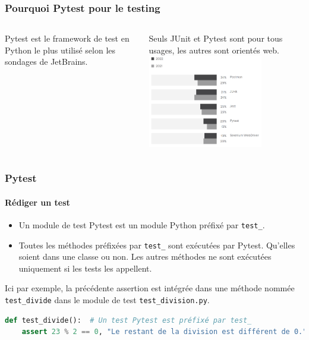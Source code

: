 \documentclass{beamer}
\begin{document}
    \begin{frame}
        \frametitle{Pourquoi Pytest pour le testing}
        \transdissolve
        \begin{columns}
            Pytest est le framework de test en Python le plus utilisé selon les sondages de JetBrains\footnotemark.

            Seuls JUnit et Pytest sont pour tous usages, les autres sont orientés web.
            \centering
            \includegraphics[width=5cm]{image/jetbrains-survey-testing-framework}
        \end{columns}

    \end{frame}

    \begin{frame}[fragile]
        \frametitle{Pytest}
        \framesubtitle{Rédiger un test}
        \transdissolve
        \begin{itemize}
            \item Un module de test Pytest est un module Python préfixé par \lstinline{test_}.

            \item Toutes les méthodes préfixées par \lstinline{test_} sont exécutées par Pytest.
            Qu'elles soient dans une classe ou non.
            Les autres méthodes ne sont exécutées uniquement si les tests les appellent.
        \end{itemize}
        Ici par exemple, la précédente assertion est intégrée dans une méthode nommée \lstinline{test_divide} dans le module de test \lstinline{test_division.py}.
        \begin{lstlisting}[language=Python]
def test_divide():  # Un test Pytest est préfixé par test_
    assert 23 % 2 == 0, "Le restant de la division est différent de 0."
        \end{lstlisting}
    \end{frame}
\end{document}
